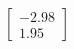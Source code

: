 \documentclass[preview]{standalone}
\begin{document}
\begin{align*}
\begin{bmatrix} -2.98 \\ 1.95 \end{bmatrix}
\end{align*}
\end{document}
